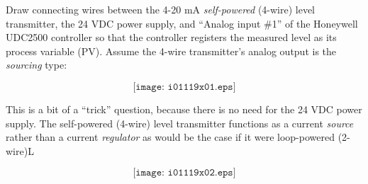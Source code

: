 

Draw connecting wires between the 4-20 mA {\it self-powered} (4-wire) level transmitter, the 24 VDC power supply, and ``Analog input \#1'' of the Honeywell UDC2500 controller so that the controller registers the measured level as its process variable (PV).  Assume the 4-wire transmitter's analog output is the {\it sourcing} type:

$$\texttt{[image: i01119x01.eps]}$$







This is a bit of a ``trick'' question, because there is no need for the 24 VDC power supply.  The self-powered (4-wire) level transmitter functions as a current {\it source} rather than a current {\it regulator} as would be the case if it were loop-powered (2-wire)L

$$\texttt{[image: i01119x02.eps]}$$











